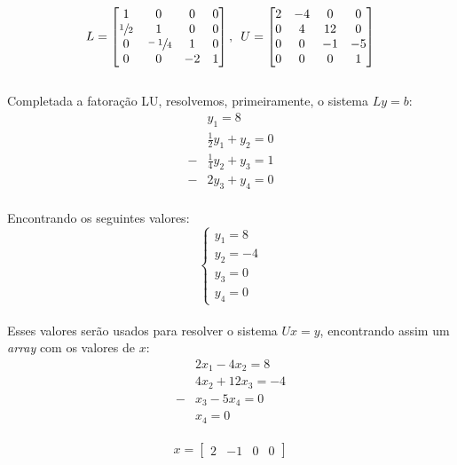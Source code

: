 \[
    L = \begin{bmatrix}
        1            & 0             & 0  & 0 \\
        \sfrac{1}{2} & 1             & 0  & 0 \\
        0            & \sfrac{-1}{4} & 1  & 0 \\
        0            & 0             & -2 & 1
    \end{bmatrix}, \hspace{.5em}
    U = \begin{bmatrix}
        2 & -4 & 0  & 0  \\
        0 & 4  & 12 & 0  \\
        0 & 0  & -1 & -5 \\
        0 & 0  & 0  & 1
    \end{bmatrix}
\]
\\

Completada a fatoração LU, resolvemos, primeiramente, o sistema $Ly=b$:
\\

\[
    \begin{aligned}
          & y_1 = 8                  \\
          & \frac{1}{2}y_1 + y_2 = 0 \\
        - & \frac{1}{4}y_2+y_3 = 1   \\
        - & 2y_3+y_4 = 0
    \end{aligned}
\]
\\

Encontrando os seguintes valores:
\\

\[
    \begin{cases}
        y_1 = 8  \\
        y_2 = -4 \\
        y_3 = 0  \\
        y_4 = 0
    \end{cases}
\]
\\

Esses valores serão usados para resolver o sistema $Ux=y$, encontrando assim um \textit{array} com os valores de $x$:
\\

\[
    \begin{aligned}
          & 2x_1 - 4x_2= 8    \\
          & 4x_2 + 12x_3 = -4 \\
        - & x_3 - 5x_4 = 0    \\
          & x_4  = 0
    \end{aligned}
\]
\\

\begin{equation}
    x =\begin{bmatrix}
        2 & -1 & 0 & 0
    \end{bmatrix}
\end{equation}
\\
